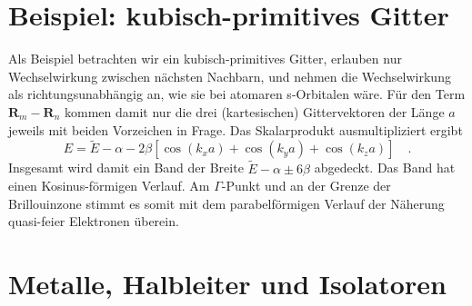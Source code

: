 \section{Beispiel: kubisch-primitives Gitter}

Als Beispiel betrachten wir ein kubisch-primitives Gitter, erlauben nur Wechselwirkung zwischen nächsten Nachbarn, und nehmen die Wechselwirkung als richtungsunabhängig an, wie sie bei atomaren s-Orbitalen wäre. Für den Term $\mathbf{R}_m  - \mathbf{R}_n$ kommen damit nur die drei (kartesischen) Gittervektoren der Länge $a$ jeweils mit beiden Vorzeichen in Frage. Das Skalarprodukt ausmultipliziert ergibt
\begin{equation}
    E = \tilde{E} - \alpha - 2 \beta \left[ \cos( k_x a ) +  \cos( k_y a ) +  \cos( k_z a ) \right] \quad .
\end{equation}
Insgesamt wird damit ein Band der Breite $\tilde{E} - \alpha \pm  6 \beta $ abgedeckt. Das Band hat einen Kosinus-förmigen Verlauf. Am $\Gamma$-Punkt und an der Grenze der Brillouinzone stimmt es somit mit dem parabelförmigen Verlauf der Näherung quasi-feier Elektronen überein. 








\section{Metalle, Halbleiter und Isolatoren}

